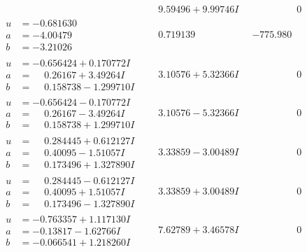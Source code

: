 \documentclass[1p]{elsarticle_modified}
\theoremstyle{definition}
\begin{document}
$$\begin{array}{c|c|c}
 & \phantom{-}9.59496 + 9.99746 I & \phantom{-0.000000 } 0 \\ \hline\begin{aligned}
u &= -0.681630\phantom{ +0.000000I} \\
a &= -4.00479\phantom{ +0.000000I} \\
b &= -3.21026\phantom{ +0.000000I}\end{aligned}
 & \phantom{-}0.719139\phantom{ +0.000000I} & -775.980\phantom{ +0.000000I} \\ \hline\begin{aligned}
u &= -0.656424 + 0.170772 I \\
a &= \phantom{-}0.26167 + 3.49264 I \\
b &= \phantom{-}0.158738 - 1.299710 I\end{aligned}
 & \phantom{-}3.10576 + 5.32366 I & \phantom{-0.000000 } 0 \\ \hline\begin{aligned}
u &= -0.656424 - 0.170772 I \\
a &= \phantom{-}0.26167 - 3.49264 I \\
b &= \phantom{-}0.158738 + 1.299710 I\end{aligned}
 & \phantom{-}3.10576 - 5.32366 I & \phantom{-0.000000 } 0 \\ \hline\begin{aligned}
u &= \phantom{-}0.284445 + 0.612127 I \\
a &= \phantom{-}0.40095 - 1.51057 I \\
b &= \phantom{-}0.173496 + 1.327890 I\end{aligned}
 & \phantom{-}3.33859 - 3.00489 I & \phantom{-0.000000 } 0 \\ \hline\begin{aligned}
u &= \phantom{-}0.284445 - 0.612127 I \\
a &= \phantom{-}0.40095 + 1.51057 I \\
b &= \phantom{-}0.173496 - 1.327890 I\end{aligned}
 & \phantom{-}3.33859 + 3.00489 I & \phantom{-0.000000 } 0 \\ \hline\begin{aligned}
u &= -0.763357 + 1.117130 I \\
a &= -0.13817 - 1.62766 I \\
b &= -0.066541 + 1.218260 I\end{aligned}
 & \phantom{-}7.62789 + 3.46578 I & \phantom{-0.000000 } 0 \\ \hline\begin{aligned}

\end{aligned}
\end{array}$$
\end{document}
